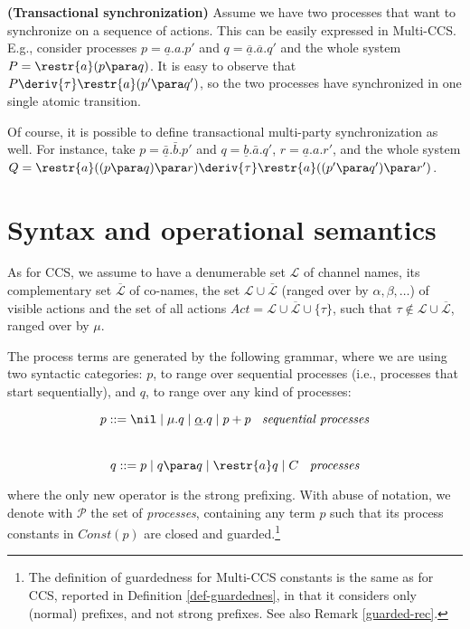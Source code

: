 \begin{example}\label{trans-synch}{\bf (Transactional synchronization)} 
Assume we have two processes that want to synchronize
on a sequence of actions. 
This can be easily expressed in Multi-CCS. E.g., consider processes $p = \underline{a}.a.p'$ and
$q =\underline{\overline{a}}.\overline{a}.q'$ and the whole system $P = \restr{a}(p \para q)$. It is easy to observe
that $P \deriv{\tau} \restr{a}(p' \para q')$, so the two processes have synchronized in one single atomic transition.

Of course, it is possible to define transactional multi-party synchronization as well. 
For instance,  take
$p =\underline{\bar{a}}.\bar{b}.p'$ and $q = \underline{b}.\bar{a}.q'$, $r = \underline{a}.a.r'$, and the whole system $Q =
 \restr{a}((p \para q) \para r) \deriv{\tau} \restr{a}((p' \para q') \para r')$.
\fine
\end{example}


\section{Syntax and operational semantics} \label{syntax-sos-multi}

As for CCS, we assume to have a denumerable set ${\mathcal L}$ of channel names, its complementary 
set  $\overline{\mathcal L}$ of co-names, the set  ${\mathcal L}\cup\overline{\mathcal L}$ (ranged over by $\alpha, \beta, \ldots$)
of visible actions and the set of all actions $Act = {\mathcal L} \cup \overline{\mathcal L} \cup\{\tau\}$,
such that $\tau\not\in{\mathcal L}\cup\overline{\mathcal L}$, ranged over by $\mu$.

The process terms are generated by the following grammar, where we are using two syntactic categories: $p$, 
to range over sequential processes (i.e., processes that start sequentially), 
and $q$, to range over any kind of processes:

\[p ::= \nil \mid \mu.q \mid  \underline{\alpha}.q \mid p+p \; \; \mbox{  {\em sequential processes}}\]\\[-.9cm]
\[q ::= p \mid q\para q \mid \restr{a}q \mid C  \; \; \mbox{  {\em processes}}\]

\noindent
where the only new operator is the strong prefixing.
With abuse of notation, we denote with ${\mathcal P}$ the set of {\em processes}, containing any term $p$
such that its process constants in $Const(p)$ are
closed  and guarded.\footnote{The definition of guardedness for Multi-CCS constants is the same as
for CCS, reported in Definition \ref{def-guardednes}, in that it considers only (normal) prefixes, and not strong prefixes.
See also Remark \ref{guarded-rec}.} 

